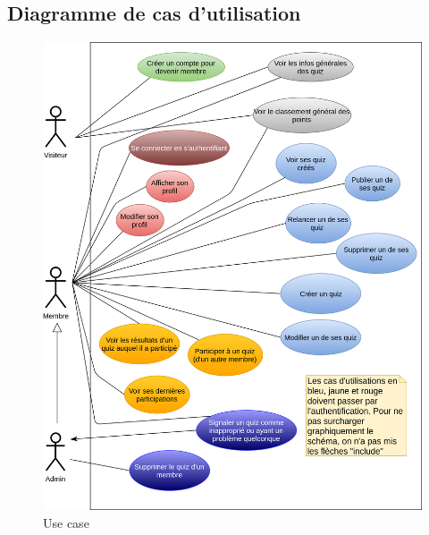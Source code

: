 \documentclass[a4paper, 12pt]{article}
\begin{document}
\subsection{Diagramme de cas d'utilisation}
\begin{figure}
	\begin{center}
		\includegraphics[width=1.0\textwidth]{diagrams/UseCaseQuiz.png}
	\end{center}
    \caption{Use case}
\end{figure}
\end{document}
